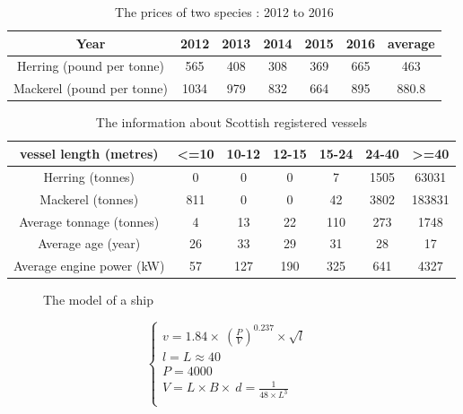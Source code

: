 \documentclass{mcmthesis}
\begin{document}
\begin{table}[!htb]
\centering
\setlength{\abovecaptionskip}{0pt}%
\setlength{\belowcaptionskip}{13pt}%
\caption{The prices of two species : 2012 to 2016}
\begin{tabular}{ccccccc}
\toprule[1.5pt]
Year&2012&2013&2014&2015&2016&average\\
\bottomrule[1.5pt]
Herring (pound  per tonne)  &565&408&308&369&665&463\\
Mackerel (pound  per tonne)  &1034&979&832&664&895&880.8\\
\bottomrule[1.5pt]
\end{tabular}
\end{table}


\begin{table}[!htb]
\centering
\setlength{\abovecaptionskip}{0pt}%
\setlength{\belowcaptionskip}{13pt}%
\caption{The information about Scottish registered vessels}
\begin{tabular}{ccccccc}
\toprule[1.5pt]
vessel length (metres)&<=10&10-12&12-15&15-24&24-40&>=40\\
\bottomrule[1.5pt]
Herring (tonnes)&0&0&0&7&1505&63031\\
Mackerel (tonnes) &811&0&0&42&3802&183831\\
Average tonnage (tonnes)&4&13&22&110&273&1748\\
Average age (year)&26&33&29&31&28&17\\
Average engine power (kW)&57&127&190&325&641&4327\\

\bottomrule[1.5pt]
\end{tabular}
\end{table}

\begin{figure}[tbp]
  \caption{The model of a ship}\label{figure1}
\end{figure}

\begin{equation}
\left\{
\begin{array}{lr}
v=1.84\times \ (\frac{P}{V}) ^{0.237} \times \sqrt{l} &\\
l=L\approx 40 &\\
P=4000&\\
V=L\times B\times\ d =\frac{1}{48\times L^3}\\
\end{array}
\right.
\end{equation}
\end{document}
